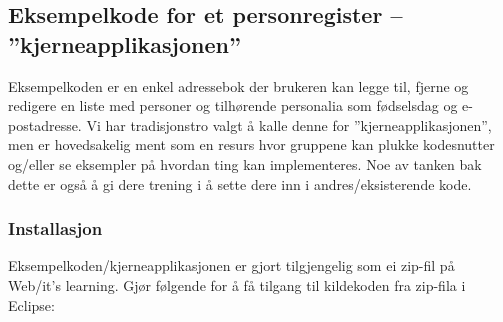 \documentclass[a4paper]{scrartcl}
\begin{document}
\subsection{Eksempelkode for et personregister – ”kjerneapplikasjonen”}

Eksempelkoden er en enkel adressebok der brukeren kan legge til, fjerne og redigere en liste med personer og tilhørende personalia som fødselsdag og e-postadresse. Vi har tradisjonstro valgt å kalle denne for ”kjerneapplikasjonen”, men er hovedsakelig ment som en resurs hvor gruppene kan plukke kodesnutter og/eller se eksempler på hvordan ting kan implementeres. Noe av tanken bak dette er også å gi dere trening i å sette dere inn i andres/eksisterende kode.

\subsubsection{Installasjon}

Eksempelkoden/kjerneapplikasjonen er gjort tilgjengelig som ei zip-fil på Web/it’s learning. Gjør følgende for å få tilgang til kildekoden fra zip-fila i Eclipse:
\end{document}
